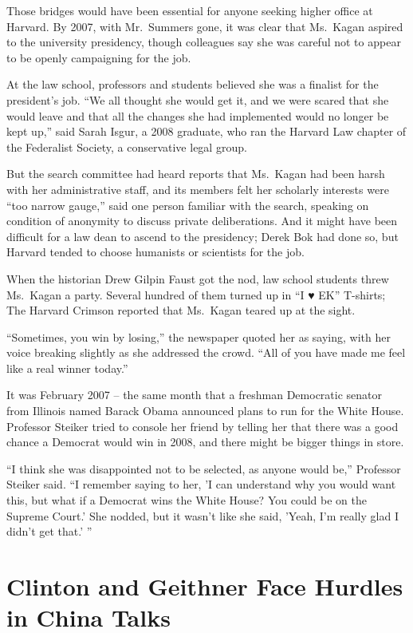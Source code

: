 ﻿\documentclass[12pt]{article}
\begin{document}
Those bridges would have been essential for anyone seeking higher office at Harvard. By 2007, with
Mr.~Summers gone, it was clear that Ms.~Kagan aspired to the university presidency, though
colleagues say she was careful not to appear to be openly campaigning for the job.

At the law school, professors and students believed she was a finalist for the president's job. ``We
all thought she would get it, and we were scared that she would leave and that all the changes she
had implemented would no longer be kept up,'' said Sarah Isgur, a 2008 graduate, who ran the Harvard
Law chapter of the Federalist Society, a conservative legal group.

But the search committee had heard reports that Ms.~Kagan had been harsh with her administrative
staff, and its members felt her scholarly interests were ``too narrow gauge,'' said one person
familiar with the search, speaking on condition of anonymity to discuss private deliberations. And
it might have been difficult for a law dean to ascend to the presidency; Derek Bok had done so, but
Harvard tended to choose humanists or scientists for the job.

When the historian Drew Gilpin Faust got the nod, law school students threw Ms.~Kagan a party.
Several hundred of them turned up in ``I ♥ EK'' T-shirts; The Harvard Crimson reported that
Ms.~Kagan teared up at the sight.

``Sometimes, you win by losing,'' the newspaper quoted her as saying, with her voice breaking
slightly as she addressed the crowd. ``All of you have made me feel like a real winner today.''

It was February 2007 -- the same month that a freshman Democratic senator from Illinois named Barack
Obama announced plans to run for the White House. Professor Steiker tried to console her friend by
telling her that there was a good chance a Democrat would win in 2008, and there might be bigger
things in store.

``I think she was disappointed not to be selected, as anyone would be,'' Professor Steiker said. ``I
remember saying to her, 'I can understand why you would want this, but what if a Democrat wins the
White House? You could be on the Supreme Court.' She nodded, but it wasn't like she said, 'Yeah, I'm
really glad I didn't get that.' ''

\section{Clinton and Geithner Face Hurdles in China Talks}
\end{document}
